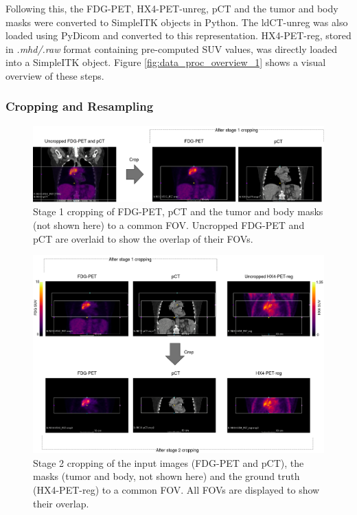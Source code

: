 Following this, the FDG-PET, HX4-PET-unreg, pCT and the tumor and body masks were converted to SimpleITK objects in Python. The ldCT-unreg was also loaded using PyDicom and converted to this representation. HX4-PET-reg, stored in \textit{.mhd/.raw} format containing pre-computed SUV values, was directly loaded into a SimpleITK object. Figure \ref{fig:data_proc_overview_1} shows a visual overview of these steps.


\subsubsection{Cropping and Resampling}

\begin{figure}[h!]
    \centering
    \includegraphics[width=\linewidth]{figures/Data/fdgpet_pct_crop1/N010-FDG_PET_pCT-uncropped_crop1.png}
    \caption{Stage 1 cropping of FDG-PET, pCT and the tumor and body masks (not shown here) to a common FOV. Uncropped FDG-PET and pCT are overlaid to show the overlap of their FOVs.}
    \label{fig:fdg_pet_pct_crop1}
\end{figure}

\begin{figure}[h!]
    \centering
    \includegraphics[width=\linewidth]{figures/Data/fdgpet_pct_fx4petreg_crop2/N010-fdgpet_pct_hx4petreg-uncropped_crop2.png}
    \caption{Stage 2 cropping of the input images (FDG-PET and pCT), the masks (tumor and body, not shown here) and the ground truth (HX4-PET-reg) to a common FOV. All FOVs are displayed to show their overlap.}
    \label{fig:fdgpet_pct_hx4petreg_crop2}
\end{figure}

